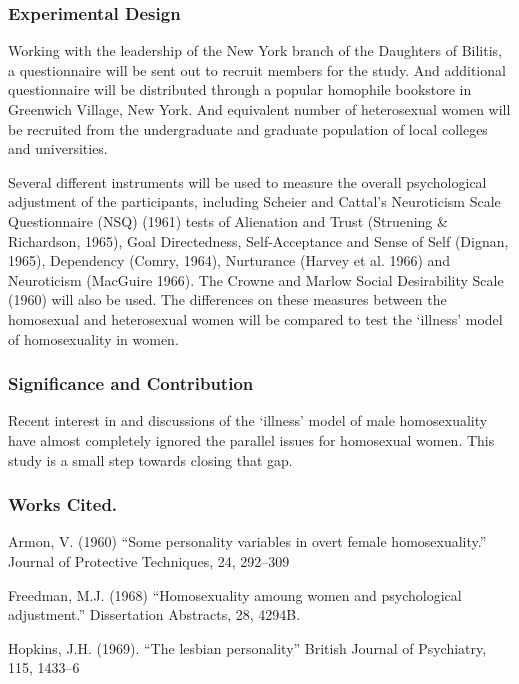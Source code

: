 \subsubsection{Experimental Design}
\label{experimentaldesign}

Working with the leadership of the New York branch of the Daughters of Bilitis, a questionnaire will be sent out to recruit members for the study. And additional questionnaire will be distributed through a popular homophile bookstore in Greenwich Village, New York. And equivalent number of heterosexual women will be recruited from the undergraduate and graduate population of local colleges and universities.

Several different instruments will be used to measure the overall psychological adjustment of the participants, including Scheier and Cattal's Neuroticism Scale Questionnaire (NSQ) (1961) tests of Alienation and Trust (Struening \& Richardson, 1965), Goal Directedness, Self-Acceptance and Sense of Self (Dignan, 1965), Dependency (Comry, 1964), Nurturance (Harvey et al. 1966) and Neuroticism (MacGuire 1966). The Crowne and Marlow Social Desirability Scale (1960) will also be used. The differences on these measures between the homosexual and heterosexual women will be compared to test the `illness' model of homosexuality in women.

\subsubsection{Significance and Contribution}
\label{significanceandcontribution}

Recent interest in and discussions of the `illness' model of male homosexuality have almost completely ignored the parallel issues for homosexual women. This study is a small step towards closing that gap.

\subsubsection{Works Cited.}
\label{workscited.}

Armon, V. (1960) ``Some personality variables in overt female homosexuality.'' Journal of Protective Techniques, 24, 292--309

Freedman, M.J. (1968) ``Homosexuality amoung women and psychological adjustment.'' Dissertation Abstracts, 28, 4294B.

Hopkins, J.H. (1969). ``The lesbian personality'' British Journal of Psychiatry, 115, 1433--6

